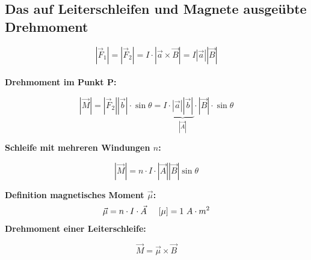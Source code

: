 \subsection{Das auf Leiterschleifen und Magnete ausgeübte Drehmoment}
\[
    |\Vec{F}_1| = |\Vec{F}_2| = I \cdot |\Vec{a} \times \Vec{B}| = I |\Vec{a}||\Vec{B}|
\]
\\[1ex]
\textbf{Drehmoment im Punkt P:}
\begin{formulabox}
    \[
        |\Vec{M}| = |\Vec{F}_2||\Vec{b}|\cdot \sin{\theta} = I\cdot \underbrace{|\Vec{a}||\Vec{b}|}_{|\Vec{A}|} \cdot |\Vec{B}| \cdot \sin{\theta}
    \]
\end{formulabox}

\textbf{Schleife mit mehreren Windungen $n$:}
\begin{formulabox}
    \[
        |\Vec{M}| = n \cdot I \cdot |\Vec{A}||\Vec{B}| \sin{\theta}
    \]
\end{formulabox}
    
\textbf{Definition magnetisches Moment $\Vec{\mu}$:}
\[
    \Vec{\mu} = n \cdot I \cdot \Vec{A} \hspace{5mm} [\mu] = 1 \ A \cdot m^2
\]
\textbf{Drehmoment einer Leiterschleife:}
\begin{formulabox}
    \[
        \Vec{M} = \Vec{\mu} \times \Vec{B}
    \]
\end{formulabox}